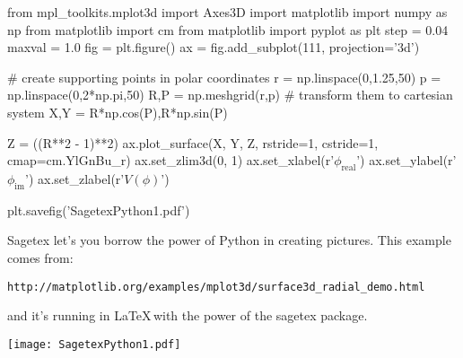 \documentclass{article}
\begin{document}
\begin{sagesilent}
from mpl_toolkits.mplot3d import Axes3D
import matplotlib
import numpy as np
from matplotlib import cm
from matplotlib import pyplot as plt
step = 0.04
maxval = 1.0
fig = plt.figure()
ax = fig.add_subplot(111, projection='3d')

# create supporting points in polar coordinates
r = np.linspace(0,1.25,50)
p = np.linspace(0,2*np.pi,50)
R,P = np.meshgrid(r,p)
# transform them to cartesian system
X,Y = R*np.cos(P),R*np.sin(P)

Z = ((R**2 - 1)**2)
ax.plot_surface(X, Y, Z, rstride=1, cstride=1, cmap=cm.YlGnBu_r)
ax.set_zlim3d(0, 1)
ax.set_xlabel(r'$\phi_\mathrm{real}$')
ax.set_ylabel(r'$\phi_\mathrm{im}$')
ax.set_zlabel(r'$V(\phi)$')

plt.savefig('SagetexPython1.pdf')
\end{sagesilent}
Sagetex let's you borrow the power of Python in creating pictures. This
example comes from:
\begin{verbatim}
http://matplotlib.org/examples/mplot3d/surface3d_radial_demo.html
\end{verbatim}
and it's running in \LaTeX \,with the power of the sagetex package.
\begin{center}
\texttt{[image: SagetexPython1.pdf]}
\end{center}
\end{document}
